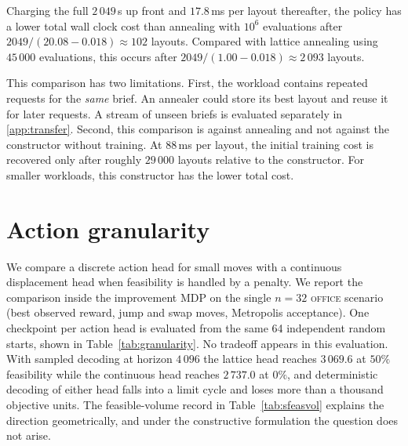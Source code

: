 \documentclass[11pt]{article}
\begin{document}
Charging the full $2\,049$\,s up front and $17.8$\,ms per layout thereafter,
the policy has a lower total wall clock cost than annealing with $10^{6}$
evaluations after $2049/(20.08-0.018)\approx102$ layouts. Compared with lattice
annealing using $45\,000$ evaluations, this occurs after
$2049/(1.00-0.018)\approx2\,093$ layouts.

This comparison has two limitations. First, the workload contains repeated
requests for the \emph{same} brief. An annealer could store its best layout and
reuse it for later requests. A stream of unseen briefs is evaluated separately
in \ref{app:transfer}. Second, this comparison is against annealing and not
against the constructor without training. At $88$\,ms per layout, the initial
training cost is recovered only after roughly $29\,000$ layouts relative to the
constructor. For smaller workloads, this constructor has the lower total cost.

\section{Action granularity}
\label{app:granularity}
We compare a discrete action head for small moves with a continuous displacement
head when feasibility is handled by a penalty. We report the comparison inside
the improvement MDP on the single $n=32$ \textsc{office} scenario
(best observed reward, jump and swap moves, Metropolis acceptance). One checkpoint
per action head is evaluated from the same 64 independent random starts, shown in
Table~\ref{tab:granularity}. No tradeoff appears in this evaluation. With
sampled decoding at horizon $4\,096$ the lattice head reaches $3\,069.6$ at
$50\%$ feasibility while the continuous head reaches $2\,737.0$ at $0\%$, and
deterministic decoding of either head falls into a limit cycle and loses more
than a thousand objective units. The feasible-volume record in
Table~\ref{tab:sfeasvol} explains the direction geometrically, and under the constructive
formulation the question does not arise.
\end{document}
